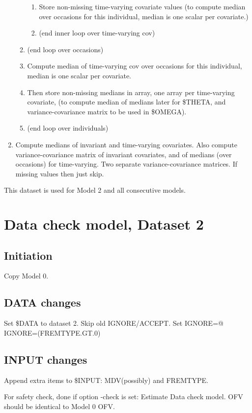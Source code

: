 \begin{enumerate}
\begin{enumerate}
\begin{enumerate}
    \item Store non-missing time-varying covariate values (to compute median over occasions for this individual, 
    median is one scalar per covariate.) 
    \item[] (end inner loop over time-varying cov)
\end{enumerate}
\item[] (end loop over occasions)
\item Compute median of time-varying cov over occasions for this individual, median is one scalar per covariate.
\item Then store non-missing medians in array, one array per time-varying covariate, (to compute 
median of medians later for \$THETA, and variance-covariance matrix  to be used in \$OMEGA).
\item[] (end loop over individuals)
\end{enumerate}

	\item Compute medians of invariant and time-varying covariates. Also compute variance-covariance matrix of invariant covariates, and of medians (over occasions) for time-varying. Two separate variance-covariance matrices. If missing values then just skip.
\end{enumerate}

This dataset is used for Model 2 and all consecutive models.

\section{Data check model, Dataset 2}
\subsection{Initiation}
Copy Model 0.

\subsection{DATA changes}
Set \$DATA to dataset 2. Skip old IGNORE/ACCEPT. Set IGNORE=@ IGNORE=(FREMTYPE.GT.0)

\subsection{INPUT changes}
Append extra items to \$INPUT: MDV(possibly) and FREMTYPE.

For safety check, done if option -check is set: Estimate Data check model. OFV should be identical to Model 0 OFV.

